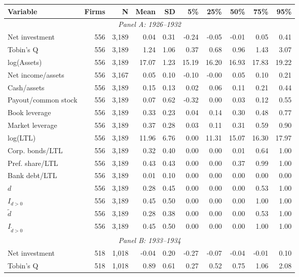 \begin{threeparttable}
\begin{tabular}{lrrrrrrrrr}
\toprule
Variable & Firms & N & Mean & SD & 5\% & 25\% & 50\% & 75\% & 95\% \\
\midrule
\multicolumn{10}{c}{\textit{Panel A: 1926--1932}} \\
\midrule
Net investment & 556 & 3,189 & 0.04 & 0.31 & -0.24 & -0.05 & -0.01 & 0.05 & 0.41 \\
Tobin's Q & 556 & 3,189 & 1.24 & 1.06 & 0.37 & 0.68 & 0.96 & 1.43 & 3.07 \\
log(Assets) & 556 & 3,189 & 17.07 & 1.23 & 15.19 & 16.20 & 16.93 & 17.83 & 19.22 \\
Net income/assets & 556 & 3,167 & 0.05 & 0.10 & -0.10 & -0.00 & 0.05 & 0.10 & 0.21 \\
Cash/assets & 556 & 3,189 & 0.15 & 0.13 & 0.02 & 0.06 & 0.11 & 0.21 & 0.44 \\
Payout/common stock & 556 & 3,189 & 0.07 & 0.62 & -0.32 & 0.00 & 0.03 & 0.12 & 0.55 \\
Book leverage & 556 & 3,189 & 0.33 & 0.23 & 0.04 & 0.14 & 0.30 & 0.48 & 0.77 \\
Market leverage & 556 & 3,189 & 0.37 & 0.28 & 0.03 & 0.11 & 0.31 & 0.59 & 0.90 \\
log(LTL) & 556 & 3,189 & 11.96 & 6.76 & 0.00 & 11.31 & 15.07 & 16.30 & 17.97 \\
Corp. bonds/LTL & 556 & 3,189 & 0.32 & 0.40 & 0.00 & 0.00 & 0.01 & 0.64 & 1.00 \\
Pref. share/LTL & 556 & 3,189 & 0.43 & 0.43 & 0.00 & 0.00 & 0.37 & 0.99 & 1.00 \\
Bank debt/LTL & 556 & 3,189 & 0.01 & 0.10 & 0.00 & 0.00 & 0.00 & 0.00 & 0.00 \\
\ensuremath{d} & 556 & 3,189 & 0.28 & 0.45 & 0.00 & 0.00 & 0.00 & 0.53 & 1.00 \\
\ensuremath{I_{d>0}} & 556 & 3,189 & 0.45 & 0.50 & 0.00 & 0.00 & 0.00 & 1.00 & 1.00 \\
\ensuremath{\tilde{d}} & 556 & 3,189 & 0.28 & 0.38 & 0.00 & 0.00 & 0.00 & 0.53 & 1.00 \\
\ensuremath{I_{\tilde{d}>0}} & 556 & 3,189 & 0.45 & 0.50 & 0.00 & 0.00 & 0.00 & 1.00 & 1.00 \\
\midrule
\multicolumn{10}{c}{\textit{Panel B: 1933--1934}} \\
\midrule
Net investment & 518 & 1,018 & -0.04 & 0.20 & -0.27 & -0.07 & -0.04 & -0.01 & 0.10 \\
Tobin's Q & 518 & 1,018 & 0.89 & 0.61 & 0.27 & 0.52 & 0.75 & 1.06 & 2.08 \\

\end{tabular}
\end{threeparttable}
